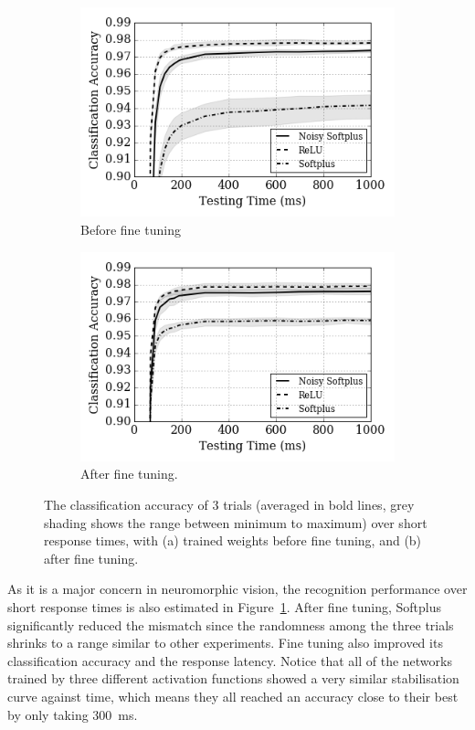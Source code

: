 \documentclass{article}
\begin{document}
\begin{figure}[htb!]
	\centering
	\begin{subfigure}[t]{0.49\textwidth}
		\includegraphics[width=\textwidth]{pics_iconip/8-2.png}
		\caption{Before fine tuning}
	\end{subfigure}
	\begin{subfigure}[t]{0.49\textwidth}
		\includegraphics[width=\textwidth]{pics_iconip/8-3.png}
		\caption{After fine tuning.}
	\end{subfigure}
	
	\caption{The classification accuracy of 3 trials (averaged in bold lines, grey shading shows the range between minimum to maximum) over short response times, with (a) trained weights before fine tuning, and (b) after fine tuning.}
	\label{fig:ca_time}	
\end{figure}

As it is a major concern in neuromorphic vision, the recognition performance over short response times is also estimated in Figure~\ref{fig:ca_time}.
After fine tuning, Softplus significantly reduced the mismatch since the randomness among the three trials shrinks to a range similar to other experiments.
Fine tuning also improved its classification accuracy and the response latency.
Notice that all of the networks trained by three different activation functions showed a very similar stabilisation curve against time, which means they all reached an accuracy close to their best by only taking 300~ms. 
\end{document}
